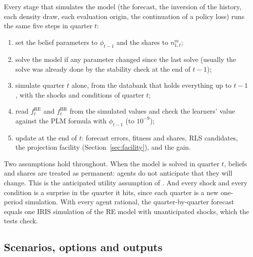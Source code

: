 \documentclass[pdflatex,sn-basic]{sn-jnl}
\newcommand{\RE}{\mathrm{RE}}
\newcommand{\BR}{\mathrm{BR}}
\newcommand{\fRE}{f^{\RE}}
\newcommand{\fBR}{f^{\BR}}
\begin{document}
Every stage that simulates the model (the forecast, the inversion of the history, each density
draw, each evaluation origin, the continuation of a policy loss) runs the same five steps in
quarter $t$:
\begin{enumerate}[1.]
\item set the belief parameters to $\phi_{t-1}$ and the shares to $n^{m}_{1,t}$;
\item solve the model if any parameter changed since the last solve (usually the solve was
      already done by the stability check at the end of $t-1$);
\item simulate quarter $t$ alone, from the databank that holds everything up to $t-1$, with the
      shocks and conditions of quarter $t$;
\item read $\fRE_t$ and $\fBR_t$ from the simulated values and check the learners' value against
      the PLM formula with $\phi_{t-1}$ (to $10^{-9}$);
\item update at the end of $t$: forecast errors, fitness and shares, RLS candidates, the
      projection facility (Section~\ref{sec:facility}), and the gain.
\end{enumerate}
Two assumptions hold throughout. When the model is solved in quarter $t$, beliefs and shares are
treated as permanent: agents do not anticipate that they will change. This is the anticipated
utility assumption of \citet{kreps1998} \citep[see also][]{cogley2008}. And every shock and every
condition is a surprise in the quarter it hits, since each quarter is a new one-period
simulation. With every agent rational, the quarter-by-quarter forecast equals one IRIS simulation
of the RE model with unanticipated shocks, which the tests check.

\subsection{Scenarios, options and outputs}\label{sec:scenarios}
\end{document}
